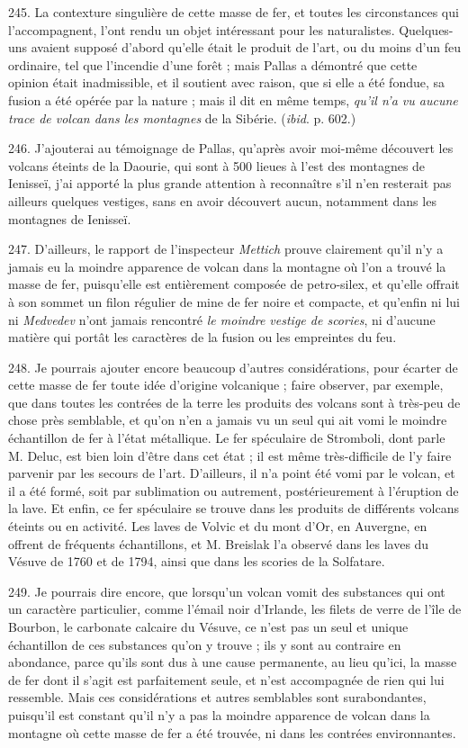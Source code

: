 \documentclass[a4paper, 11pt, oneside, polutonikogreek, french]{article}
\begin{document}
245. La contexture singulière de cette masse de fer, et toutes les circonstances qui l’accompagnent, l'ont rendu un objet intéressant pour les naturalistes. Quelques-uns avaient supposé d'abord qu'elle était le produit de l'art, ou du moins d'un feu ordinaire, tel que l'incendie d'une forêt ; mais Pallas a démontré que cette opinion était inadmissible, et il soutient avec raison, que si elle a été fondue, sa fusion a été opérée par la nature ; mais il dit en même temps, \emph{qu'il n'a vu aucune trace de volcan dans les montagnes} de la Sibérie. (\emph{ibid}. p. 602.)

246. J'ajouterai au témoignage de Pallas, qu'après avoir moi-même découvert les volcans éteints de la Daourie, qui sont à 500 lieues à l'est des montagnes de Ienisseï, j'ai apporté la plus grande attention à reconnaître s'il n'en resterait pas ailleurs quelques vestiges, sans en avoir découvert aucun, notamment dans les montagnes de Ienisseï.

247. D'ailleurs, le rapport de l'inspecteur \emph{Mettich} prouve clairement qu'il n'y a jamais eu la moindre apparence de volcan dans la montagne où l'on a trouvé la masse de fer, puisqu'elle est entièrement composée de petro-silex, et qu'elle offrait à son sommet un filon régulier de mine de fer noire et compacte, et qu'enfin ni lui ni \emph{Medvedev} n'ont jamais rencontré \emph{le moindre vestige de scories}, ni d'aucune matière qui portât les caractères de la fusion ou les empreintes du feu.

248. Je pourrais ajouter encore beaucoup d'autres considérations, pour écarter de cette masse de fer toute idée d'origine volcanique ; faire observer, par exemple, que dans toutes les contrées de la terre les produits des volcans sont à très-peu de chose près semblable, et qu'on n'en a jamais vu un seul qui ait vomi le moindre échantillon de fer à l'état métallique. Le fer spéculaire de Stromboli, dont parle M. Deluc, est bien loin d'être dans cet état ; il est même très-difficile de l'y faire parvenir par les secours de l'art. D'ailleurs, il n'a point été vomi par le volcan, et il a été formé, soit par sublimation ou autrement, postérieurement à l'éruption de la lave. Et enfin, ce fer spéculaire se trouve dans les produits de différents volcans éteints ou en activité. Les laves de Volvic et du mont d'Or, en Auvergne, en offrent de fréquents échantillons, et M. Breislak l'a observé dans les laves du Vésuve de 1760 et de 1794, ainsi que dans les scories de la Solfatare.

249. Je pourrais dire encore, que lorsqu'un volcan vomit des substances qui ont un caractère particulier, comme l'émail noir d'Irlande, les filets de verre de l'île de Bourbon, le carbonate calcaire du Vésuve, ce n'est pas un seul et unique échantillon de ces substances qu'on y trouve ; ils y sont au contraire en abondance, parce qu'ils sont dus à une cause permanente, au lieu qu'ici, la masse de fer dont il s'agit est parfaitement seule, et n'est accompagnée de rien qui lui ressemble. Mais ces considérations et autres semblables sont surabondantes, puisqu'il est constant qu'il n'y a pas la moindre apparence de volcan dans la montagne où cette masse de fer a été trouvée, ni dans les contrées environnantes.
\end{document}
